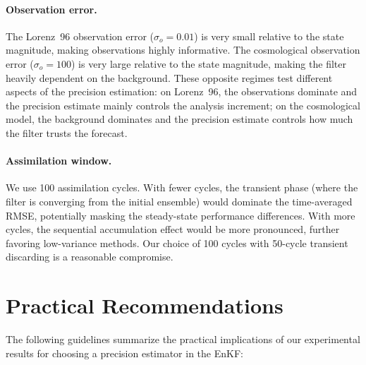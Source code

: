 \paragraph{Observation error.} The Lorenz~96 observation error ($\sigma_o = 0.01$) is very small relative to the state magnitude, making observations highly informative. The cosmological observation error ($\sigma_o = 100$) is very large relative to the state magnitude, making the filter heavily dependent on the background. These opposite regimes test different aspects of the precision estimation: on Lorenz~96, the observations dominate and the precision estimate mainly controls the analysis increment; on the cosmological model, the background dominates and the precision estimate controls how much the filter trusts the forecast.

\paragraph{Assimilation window.} We use 100 assimilation cycles. With fewer cycles, the transient phase (where the filter is converging from the initial ensemble) would dominate the time-averaged RMSE, potentially masking the steady-state performance differences. With more cycles, the sequential accumulation effect would be more pronounced, further favoring low-variance methods. Our choice of 100 cycles with 50-cycle transient discarding is a reasonable compromise.

\section{Practical Recommendations}
\label{sec:disc_practical}

The following guidelines summarize the practical implications of our experimental results for choosing a precision estimator in the EnKF:

